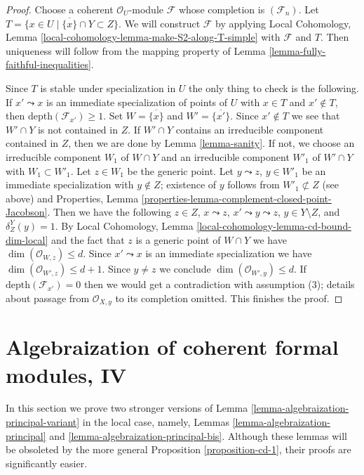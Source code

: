 \begin{proof}
Choose a coherent $\mathcal{O}_U$-module $\mathcal{F}$ whose
completion is $(\mathcal{F}_n)$. Let
$T = \{x \in U \mid \overline{\{x\}} \cap Y \subset Z\}$.
We will construct $\mathcal{F}$ by applying Local Cohomology,
Lemma \ref{local-cohomology-lemma-make-S2-along-T-simple}
with $\mathcal{F}$ and $T$.
Then uniqueness will follow from the mapping property
of Lemma \ref{lemma-fully-faithful-inequalities}.

\medskip\noindent
Since $T$ is stable under specialization in $U$ the only
thing to check is the following. If $x' \leadsto x$ is an
immediate specialization of points of $U$ with $x \in T$
and $x' \not \in T$, then $\text{depth}(\mathcal{F}_{x'}) \geq 1$.
Set $W = \overline{\{x\}}$ and $W' = \overline{\{x'\}}$.
Since $x' \not \in T$ we see that $W' \cap Y$ is not contained in $Z$.
If $W' \cap Y$ contains an irreducible component contained in $Z$,
then we are done by Lemma \ref{lemma-sanity}.
If not, we choose an irreducible component $W_1$ of $W \cap Y$ and
an irreducible component $W'_1$ of $W' \cap Y$ with $W_1 \subset W'_1$.
Let $z \in W_1$ be the generic point. Let $y \leadsto z$, $y \in W'_1$
be an immediate specialization with $y \not \in Z$; existence of $y$
follows from $W'_1 \not \subset Z$ (see above) and
Properties, Lemma \ref{properties-lemma-complement-closed-point-Jacobson}.
Then we have the following $z \in Z$, $x \leadsto z$,
$x' \leadsto y \leadsto z$, $y \in Y \setminus Z$, and $\delta^Y_Z(y) = 1$.
By Local Cohomology, Lemma \ref{local-cohomology-lemma-cd-bound-dim-local}
and the fact that $z$
is a generic point of $W \cap Y$ we have
$\dim(\mathcal{O}_{W, z}) \leq d$.
Since $x' \leadsto x$ is an immediate specialization we have
$\dim(\mathcal{O}_{W', z}) \leq d + 1$.
Since $y \not = z$ we conclude
$\dim(\mathcal{O}_{W', y}) \leq d$.
If $\text{depth}(\mathcal{F}_{x'}) = 0$ then we would get
a contradiction with assumption (3); details about passage
from $\mathcal{O}_{X, y}$ to its completion omitted.
This finishes the proof.
\end{proof}








\section{Algebraization of coherent formal modules, IV}
\label{section-algebraization-modules-local}

\noindent
In this section we prove two stronger versions of
Lemma \ref{lemma-algebraization-principal-variant}
in the local case, namely, Lemmas \ref{lemma-algebraization-principal}
and \ref{lemma-algebraization-principal-bis}.
Although these lemmas will be obsoleted by the more general
Proposition \ref{proposition-cd-1}, their proofs are significantly
easier.

